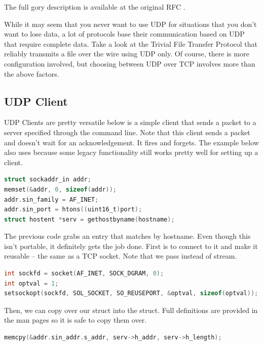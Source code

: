The full gory description is available at the original RFC \cite{rfc768}.

While it may seem that you never want to use UDP for situations that you don't want to lose data, a lot of protocols base their communication based on UDP that require complete data.
Take a look at the Trivial File Transfer Protocol that reliably transmits a file over the wire using UDP only.
Of course, there is more configuration involved, but choosing between UDP over TCP involves more than the above factors.

\subsection{UDP Client}

UDP Clients are pretty versatile below is a simple client that sends a packet to a server specified through the command line.
Note that this client sends a packet and doesn't wait for an acknowledgement.
It fires and forgets.
The example below also uses  because some legacy functionality still works pretty well for setting up a client.

\begin{lstlisting}[language=C]
struct sockaddr_in addr;
memset(&addr, 0, sizeof(addr));
addr.sin_family = AF_INET;
addr.sin_port = htons((uint16_t)port);
struct hostent *serv = gethostbyname(hostname);
\end{lstlisting}

The previous code grabs an entry  that matches by hostname.
Even though this isn't portable, it definitely gets the job done.
First is to connect to it and make it reusable -- the same as a TCP socket.
Note that we pass  instead of stream.

\begin{lstlisting}[language=C]
int sockfd = socket(AF_INET, SOCK_DGRAM, 0);
int optval = 1;
setsockopt(sockfd, SOL_SOCKET, SO_REUSEPORT, &optval, sizeof(optval));
\end{lstlisting}

Then, we can copy over our  struct into the  struct.
Full definitions are provided in the man pages so it is safe to copy them over.

\begin{lstlisting}[language=C]
memcpy(&addr.sin_addr.s_addr, serv->h_addr, serv->h_length);
\end{lstlisting}

